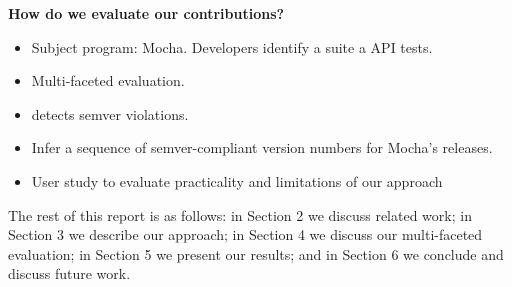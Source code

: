 {\bf How do we evaluate our contributions?}
\begin{itemize}
\item Subject program: Mocha. Developers identify a suite a API tests.
\item Multi-faceted evaluation.
\item detects semver violations.
\item Infer a sequence of semver-compliant version numbers for Mocha's
  releases.
\item User study to evaluate practicality and limitations of our
  approach
\end{itemize}


The rest of this report is as follows: in Section 2 we discuss related
work; in Section 3 we describe our approach; in Section 4 we discuss
our multi-faceted evaluation; in Section 5 we present our results; and
in Section 6 we conclude and discuss future work.

%
%
%
%

%

